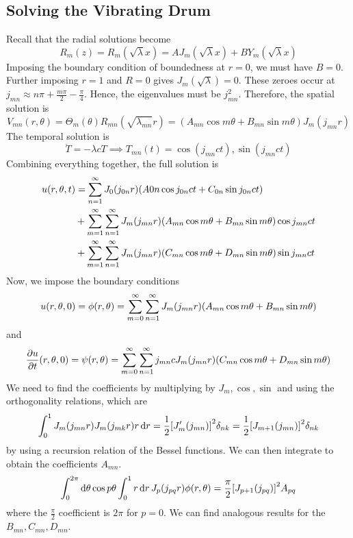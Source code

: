 \subsection{Solving the Vibrating Drum}
Recall that the radial solutions become
\[ R_m(z) = R_m(\sqrt{\lambda} x) = A J_m(\sqrt{\lambda} x) + B Y_m(\sqrt{\lambda} x) \]
Imposing the boundary condition of boundedness at \( r = 0 \), we must have \( B = 0 \).
Further imposing \( r = 1 \) and \( R = 0 \) gives \( J_m(\sqrt{\lambda}) = 0 \).
These zeroes occur at \( j_{mn} \approx n \pi + \frac{m \pi}{2} - \frac{\pi}{4} \).
Hence, the eigenvalues must be \( j^2_{mn} \).
Therefore, the spatial solution is
\[ V_{mn}(r, \theta) = \Theta_m(\theta) R_{mn}(\sqrt{\lambda_{mn}} r) = (A_{mn} \cos m \theta + B_{mn} \sin m \theta) J_m (j_{mn} r) \]
The temporal solution is
\[ \ddot T = -\lambda c T \implies T_{mn}(t) = \cos(j_{mn} ct), \sin(j_{mn} ct) \]
Combining everything together, the full solution is
\begin{align*}
    u(r,\theta,t) &= \sum_{n=1}^\infty J_0(j_{0n} r) \qty( A{0n}\cos j_{0n}ct + C_{0n}\sin j_{0n}ct ) \\
    &+ \sum_{m=1}^\infty \sum_{n=1}^\infty J_m (j_{mn}r) \qty( A_{mn} \cos m \theta + B_{mn} \sin m\theta ) \cos j_{mn} ct \\
    &+ \sum_{m=1}^\infty \sum_{n=1}^\infty J_m (j_{mn}r) \qty( C_{mn} \cos m \theta + D_{mn} \sin m\theta ) \sin j_{mn} ct
\end{align*}
Now, we impose the boundary conditions
\[ u(r,\theta,0) = \phi(r,\theta) = \sum_{m=0}^\infty \sum_{n=1}^\infty J_m (j_{mn}r) \qty( A_{mn} \cos m \theta + B_{mn} \sin m\theta ) \]
and
\[ \pdv{u}{t}\qty(r,\theta,0) = \psi(r,\theta) = \sum_{m=0}^\infty \sum_{n=1}^\infty j_{mn} c J_m (j_{mn}r) \qty( C_{mn} \cos m \theta + D_{mn} \sin m\theta ) \]
We need to find the coefficients by multiplying by \( J_m, \cos, \sin \) and using the orthogonality relations, which are
\[ \int_0^1 J_m(j_{mn} r) J_m(j_{mk} r) r \dd{r} = \frac{1}{2}\qty[J_m'(j_{mn})]^2 \delta_{nk} = \frac{1}{2}\qty[J_{m+1}(j_{mn})]^2 \delta_{nk} \]
by using a recursion relation of the Bessel functions.
We can then integrate to obtain the coefficients \( A_{mn} \).
\[ \int_0^{2\pi} \dd{\theta} \cos p\theta \int_0^1 r \dd{r} J_p(j_{pq} r) \phi(r,\theta) = \frac{\pi}{2}\qty[J_{p+1}(j_{pq})]^2 A_{pq} \]
where the \( \frac{\pi}{2} \) coefficient is \( 2\pi \) for \( p = 0 \).
We can find analogous results for the \( B_{mn}, C_{mn}, D_{mn} \).
